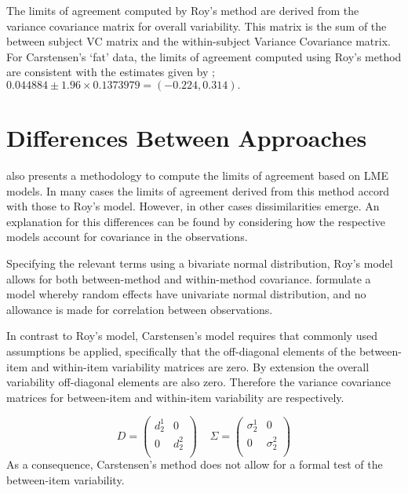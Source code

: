\documentclass[12pt, a4paper]{report}
\theoremstyle{plain}
\theoremstyle{definition}
\theoremstyle{remark}
\begin{document}
	The limits of agreement computed by Roy's method are derived from the variance covariance matrix for overall variability.
	This matrix is the sum of the between subject VC matrix and the within-subject Variance Covariance matrix.
	For Carstensen's `fat' data, the limits of agreement computed using Roy's
	method are consistent with the estimates given by \citet{BXC2008}; $0.044884  \pm 1.96 \times  0.1373979 = (-0.224,  0.314).$
	
	
	
	
	
	\section{Differences Between Approaches}
	
	\citet{BXC2008} also presents a methodology to compute the limits of agreement based on LME models. In many cases the limits of agreement derived from this method accord with those to Roy's model. However, in other cases dissimilarities emerge. An explanation for this differences can be found by considering how the respective models account for covariance in the observations. 
	
	Specifying the relevant terms using a bivariate normal distribution, Roy's model allows for both between-method and within-method covariance. \citet{BXC2008} formulate a model whereby random effects have univariate normal distribution, and no allowance is made for correlation between observations.
	
	In contrast to Roy's model, Carstensen's model requires that commonly used assumptions be applied, specifically that the off-diagonal elements of the between-item and within-item variability matrices are zero. By
	extension the overall variability off-diagonal elements are also zero. Therefore the variance covariance matrices for
	between-item and within-item variability are respectively.
	
	\[{D} = \left(
	\begin{array}{cc}
	d^1_2  & 0 \\
	0 & d^2_2 \\
	\end{array}
	\right) \;\;\;\; {\Sigma} = \left(
	\begin{array}{cc}
	\sigma^1_2  & 0 \\
	0 & \sigma^2_2 \\
	\end{array}
	\right) \]
	As a consequence, Carstensen's method does not allow for a formal test of the between-item variability.
	
\end{document}
